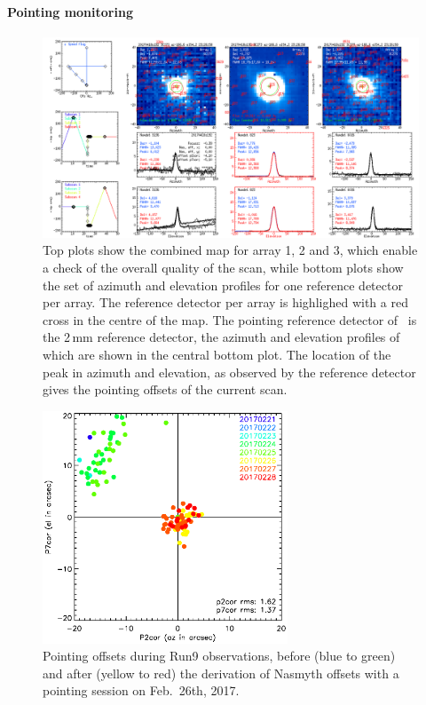 \paragraph{Pointing monitoring}

\begin{figure}[ht!]
\begin{center}
\includegraphics[clip, angle=0, scale = 0.30]{Figures/plot_20170418s192.png}
\caption[Summary plots of the reduction of pointing scan.]{Top plots
  show the combined map for array 1, 2 and 3, which enable a check of
  the overall quality of the scan, while bottom plots show the set of azimuth
  and elevation profiles for one reference detector per array. The
  reference detector per array is highlighed with a red cross in the
  centre of the map. The pointing reference detector of
  \nika\ is the 2\,mm reference detector, the azimuth
  and elevation profiles of which are shown in the central bottom
  plot. The location of the peak in azimuth and elevation, as observed by the
  reference detector gives the pointing offsets of the current scan.
}
\label{fig:ptg}
\end{center}
\end{figure}

\begin{figure}[ht!]
\begin{center}
\includegraphics[clip, angle=0, trim={0, 0, 3cm, 0}, width=0.65\textwidth]{Figures/pointing_stats_N2R9.eps}
\caption[Pointing session results]{Pointing offsets during Run9 observations,
  before (blue to green) and after (yellow to red) the
  derivation of Nasmyth offsets with a pointing session on Feb.~26th, 2017.}
\label{fig:pointing_stats_n2r9}
\end{center}
\end{figure}

